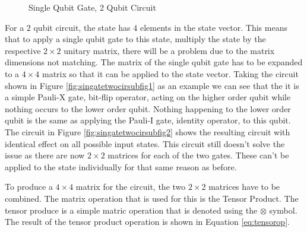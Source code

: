 \begin{figure}
\centering
{}
\caption{Single Qubit Gate, 2 Qubit Circuit}
 \label{fig:singatetwocir}
\end{figure}

For a $2$ qubit circuit, the state has $4$ elements in the state vector.
This means that to apply a single qubit gate to this state, multiply the state by the respective $2\times{2}$ unitary matrix, there will be a problem due to the matrix dimensions not matching.
The matrix of the single qubit gate has to be expanded to a $4\times{4}$ matrix so that it can be applied to the state vector.
Taking the circuit shown in Figure \ref{fig:singatetwocirsubfig1} as an example we can see that the it is a simple Pauli-X gate, bit-flip operator, acting on the higher order qubit while nothing occurs to the lower order qubit.
Nothing happening to the lower order qubit is the same as applying the Pauli-I gate, identity operator, to this qubit.
The circuit in Figure \ref{fig:singatetwocirsubfig2} shows the resulting circuit with identical effect on all possible input states.
This circuit still doesn't solve the issue as there are now $2\times{2}$ matrices for each of the two gates.
These can't be applied to the state individually for that same reason as before.

To produce a $4\times{4}$ matrix for the circuit, the two $2\times{2}$ matrices have to be combined.
The matrix operation that is used for this is the Tensor Product.
The tensor produce is a simple matric operation that is denoted using the $\otimes$ symbol.
The result of the tensor product operation is shown in Equation \ref{eq:tensorop}.

